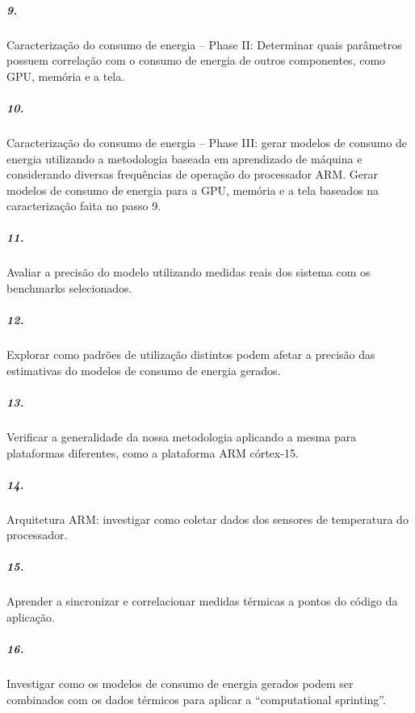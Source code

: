 \documentclass[11pt,a4paper,titlepage]{article}
\begin{document}
\subparagraph{9.} Caracterização do consumo de energia – Phase II: Determinar quais parâmetros possuem correlação com o consumo de energia de outros componentes, como GPU, memória e a tela. \\
\subparagraph{10.} Caracterização do consumo de energia – Phase III: gerar modelos de consumo de energia utilizando a metodologia baseada em aprendizado de máquina e considerando diversas frequências de operação do processador ARM. Gerar modelos de consumo de energia para a GPU, memória e a tela baseados na caracterização faita no passo 9. \\
\subparagraph{11.} Avaliar a precisão do modelo utilizando medidas reais dos sistema com os benchmarks selecionados. \\
\subparagraph{12.} Explorar como padrões de utilização distintos podem afetar a precisão das estimativas do modelos de consumo de energia gerados. 
\subparagraph{13.} Verificar a generalidade da nossa metodologia aplicando a mesma para plataformas diferentes, como a plataforma ARM córtex-15. \\
\subparagraph{14.} Arquitetura ARM: investigar como coletar dados dos sensores de temperatura do processador. \\
\subparagraph{15.} Aprender a sincronizar e correlacionar medidas térmicas a pontos do código da aplicação. \\
\subparagraph{16.} Investigar como os modelos de consumo de energia gerados podem ser combinados com os dados térmicos para aplicar a “computational sprinting”.\\\\
\end{document}

